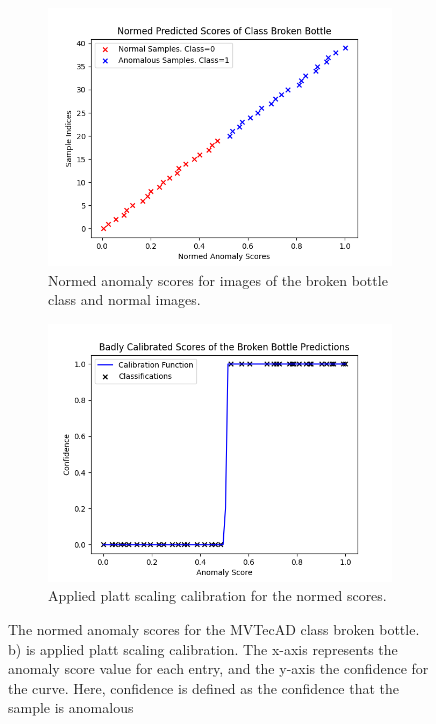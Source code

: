\begin{figure}[htbp]
    \centering
    \begin{subfigure}[b]{0.45\textwidth}
        \includegraphics[width=\textwidth]{figures/anomaly_scores_sorted.png}
        \caption{Normed anomaly scores for images of the broken bottle class and normal images.}
        \label{fig:scoresNormed}
    \end{subfigure}
    \begin{subfigure}[b]{0.45\textwidth}
        \includegraphics[width=\textwidth]{figures/anomaly_calibration_step.png}
        \caption{Applied platt scaling calibration for the normed scores.}
        \label{fig:platt}
    \end{subfigure}
    \caption{The normed anomaly scores for the MVTecAD \cite{MVTEC_Bergmann_2021} class broken bottle. b) is applied platt scaling calibration. The x-axis represents 
            the anomaly score value for each entry, and the y-axis the confidence for the curve. Here, confidence is defined as the confidence that the sample is anomalous}
    \label{fig:badCal}
\end{figure}


